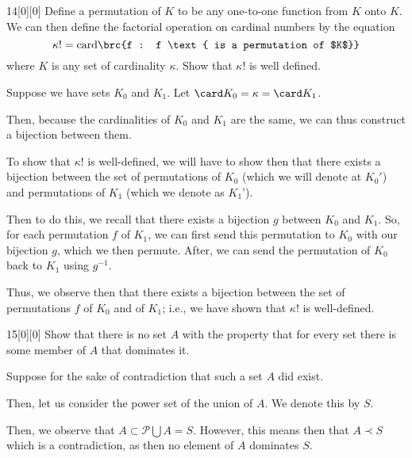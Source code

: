 \documentclass{article}
\begin{document}
\begin{hw}{14}[0][0]
	Define a permutation of $K$ to be any one-to-one function from $K$
	onto $K$. We can then define the factorial operation on cardinal numbers by the equation
	\begin{equation*}
		\kappa ! = \mathrm{card} \brc{f : f \text{ is a permutation of $K$}}
	\end{equation*}
	where $K$ is any set of cardinality $\kappa$. Show that $\kappa !$ is well defined.
\end{hw}
\begin{solution}
	Suppose we have sets $K_0$ and $K_1$. Let $\card K_0 = \kappa = \card K_1$. 
	
	Then, because the cardinalities of $K_0$ and $K_1$ are the same, we can thus construct a bijection between them.
	
	To show that $\kappa!$ is well-defined, we will have to show then that there exists a bijection between the set of permutations of $K_0$ (which we will denote at $K_0'$) and permutations of $K_1$ (which we denote as $K_1$').
	
	Then to do this, we recall that there exists a bijection $g$ between $K_0$ and $K_1$. So, for each permutation $f$ of $K_1$, we can first send this permutation to $K_0$ with our bijection $g$, which we then permute. After, we can send the permutation of $K_0$ back to $K_1$ using $g^{-1}$.
	
	Thus, we observe then that there exists a bijection between the set of permutations $f$ of $K_0$ and of $K_1$; i.e., we have shown that $\kappa!$ is well-defined.
\end{solution}

\begin{hw}{15}[0][0]
	Show that there is no set $A$ with the property that for every set there is some member of $A$ that dominates it.
\end{hw}
\begin{solution}
	Suppose for the sake of contradiction that such a set $A$ did exist.
	
	Then, let us consider the power set of the union of $A$. We denote this by $S$.
	
	Then, we observe that $A \subset \mathscr{P}\bigcup A = S$. However, this means then that $A \prec S$ which is a contradiction, as then no element of $A$ dominates $S$.
\end{solution}
\end{document}

